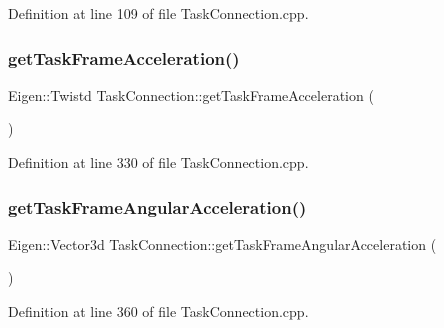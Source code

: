 Definition at line 109 of file Task\+Connection.\+cpp.

\hypertarget{classocra__recipes_1_1TaskConnection_a83e90c36f53ffda20f73b242c5de285b}{}\label{classocra__recipes_1_1TaskConnection_a83e90c36f53ffda20f73b242c5de285b} 
\subsubsection{\texorpdfstring{get\+Task\+Frame\+Acceleration()}{getTaskFrameAcceleration()}}
{\footnotesize\ttfamily Eigen\+::\+Twistd Task\+Connection\+::get\+Task\+Frame\+Acceleration (\begin{DoxyParamCaption}{ }\end{DoxyParamCaption})}



Definition at line 330 of file Task\+Connection.\+cpp.

\hypertarget{classocra__recipes_1_1TaskConnection_abae3e5305e8de9be7ccf34fdbb4d6e1a}{}\label{classocra__recipes_1_1TaskConnection_abae3e5305e8de9be7ccf34fdbb4d6e1a} 
\subsubsection{\texorpdfstring{get\+Task\+Frame\+Angular\+Acceleration()}{getTaskFrameAngularAcceleration()}}
{\footnotesize\ttfamily Eigen\+::\+Vector3d Task\+Connection\+::get\+Task\+Frame\+Angular\+Acceleration (\begin{DoxyParamCaption}{ }\end{DoxyParamCaption})}



Definition at line 360 of file Task\+Connection.\+cpp.

\hypertarget{classocra__recipes_1_1TaskConnection_a57f6e6e29aa2d09bff7c9aa7e7a322f7}{}\label{classocra__recipes_1_1TaskConnection_a57f6e6e29aa2d09bff7c9aa7e7a322f7} 
